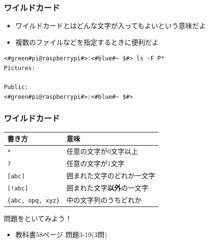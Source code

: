 \documentclass[slide03.tex]{subfiles}
\begin{document}
\begin{frame}[fragile]
    \frametitle{ワイルドカード}
    \begin{itemize}
        \item ワイルドカードとはどんな文字が入ってもよいという意味だよ
        \item 複数のファイルなどを指定するときに便利だよ
    \end{itemize}
    \begin{lstlisting}[title=ワイルドカードの使い方の例]
<#green#pi@raspberrypi#>:<#blue#~ $#> ls -F P*
Pictures:

Public:
<#green#pi@raspberrypi#>:<#blue#~ $#>
    \end{lstlisting}
\end{frame}

\begin{frame}
    \frametitle{ワイルドカード}
    \begin{tabular}{ll} \hline
        書き方 & 意味 \\ \hline
        \texttt{*} & 任意の文字が0文字以上 \\
        \texttt{?}      & 任意の文字が1文字 \\
        \texttt{[abc]}  & 囲まれた文字のどれか一文字\\
        \texttt{[!abc]} & 囲まれた文字{\bf 以外}の一文字\\
        \texttt{\{abc, opq, xyz\}} & 中の文字列のうちどれか\\ \hline
    \end{tabular}
\end{frame}

\begin{frame}
    \begin{exampleblock}{問題をといてみよう！}
        \begin{itemize}
            \item 教科書58ページ 問題3-19(3問)
        \end{itemize}
    \end{exampleblock}
\end{frame}
\end{document}
